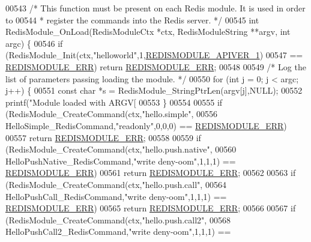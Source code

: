 \begin{DoxyCode}
00543 \textcolor{comment}{/* This function must be present on each Redis module. It is used in order to}
00544 \textcolor{comment}{ * register the commands into the Redis server. */}
00545 \textcolor{keywordtype}{int} RedisModule\_OnLoad(RedisModuleCtx *ctx, RedisModuleString **argv, \textcolor{keywordtype}{int} argc) \{
00546     \textcolor{keywordflow}{if} (RedisModule\_Init(ctx,\textcolor{stringliteral}{"helloworld"},1,\hyperlink{redismodule_8h_a1fc9be44e4cd6d60f7129d4393b6b580}{REDISMODULE\_APIVER\_1})
00547         == \hyperlink{redismodule_8h_a3df6f5bd5247289e66f44437a7cddd49}{REDISMODULE\_ERR}) \textcolor{keywordflow}{return} \hyperlink{redismodule_8h_a3df6f5bd5247289e66f44437a7cddd49}{REDISMODULE\_ERR};
00548 
00549     \textcolor{comment}{/* Log the list of parameters passing loading the module. */}
00550     \textcolor{keywordflow}{for} (\textcolor{keywordtype}{int} j = 0; j < argc; j++) \{
00551         \textcolor{keyword}{const} \textcolor{keywordtype}{char} *s = RedisModule\_StringPtrLen(argv[j],NULL);
00552         printf(\textcolor{stringliteral}{"Module loaded with ARGV[%
00553     \}
00554 
00555     \textcolor{keywordflow}{if} (RedisModule\_CreateCommand(ctx,\textcolor{stringliteral}{"hello.simple"},
00556         HelloSimple\_RedisCommand,\textcolor{stringliteral}{"readonly"},0,0,0) == \hyperlink{redismodule_8h_a3df6f5bd5247289e66f44437a7cddd49}{REDISMODULE\_ERR})
00557         \textcolor{keywordflow}{return} \hyperlink{redismodule_8h_a3df6f5bd5247289e66f44437a7cddd49}{REDISMODULE\_ERR};
00558 
00559     \textcolor{keywordflow}{if} (RedisModule\_CreateCommand(ctx,\textcolor{stringliteral}{"hello.push.native"},
00560         HelloPushNative\_RedisCommand,\textcolor{stringliteral}{"write deny-oom"},1,1,1) == 
      \hyperlink{redismodule_8h_a3df6f5bd5247289e66f44437a7cddd49}{REDISMODULE\_ERR})
00561         \textcolor{keywordflow}{return} \hyperlink{redismodule_8h_a3df6f5bd5247289e66f44437a7cddd49}{REDISMODULE\_ERR};
00562 
00563     \textcolor{keywordflow}{if} (RedisModule\_CreateCommand(ctx,\textcolor{stringliteral}{"hello.push.call"},
00564         HelloPushCall\_RedisCommand,\textcolor{stringliteral}{"write deny-oom"},1,1,1) == 
      \hyperlink{redismodule_8h_a3df6f5bd5247289e66f44437a7cddd49}{REDISMODULE\_ERR})
00565         \textcolor{keywordflow}{return} \hyperlink{redismodule_8h_a3df6f5bd5247289e66f44437a7cddd49}{REDISMODULE\_ERR};
00566 
00567     \textcolor{keywordflow}{if} (RedisModule\_CreateCommand(ctx,\textcolor{stringliteral}{"hello.push.call2"},
00568         HelloPushCall2\_RedisCommand,\textcolor{stringliteral}{"write deny-oom"},1,1,1) == 
}
\end{DoxyCode}
